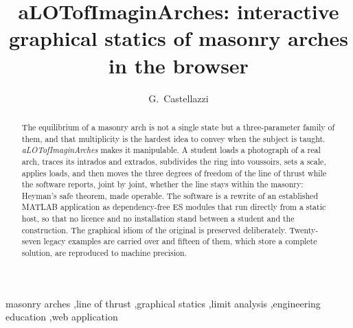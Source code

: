 \documentclass[final,3p,times,twocolumn]{elsarticle}
\begin{document}
\begin{frontmatter}

\title{aLOTofImaginArches: interactive graphical statics of masonry arches
       in the browser}

\author{G.~Castellazzi}
\address{Department of Civil, Chemical, Environmental and Materials
  Engineering (DICAM), University of Bologna, Viale Risorgimento 2,
  40136 Bologna, Italy \\
  \small{\tt giovanni.castellazzi@unibo.it}}

\begin{abstract}
The equilibrium of a masonry arch is not a single state but a
three-parameter family of them, and that multiplicity is the hardest idea to
convey when the subject is taught. \emph{aLOTofImaginArches} makes it
manipulable. A student loads a photograph of a real arch, traces its intrados
and extrados, subdivides the ring into voussoirs, sets a scale, applies loads,
and then moves the three degrees of freedom of the line of thrust while the
software reports, joint by joint, whether the line stays within the masonry:
Heyman's safe theorem, made operable. The software is a rewrite of an
established MATLAB application as dependency-free ES modules that run directly
from a static host, so that no licence and no installation stand between a
student and the construction. The graphical idiom of the original is preserved
deliberately. Twenty-seven legacy examples are carried over and fifteen of
them, which store a complete solution, are reproduced to machine precision.
\end{abstract}

\begin{keyword}
masonry arches \sep line of thrust \sep graphical statics \sep limit analysis
\sep engineering education \sep web application
\end{keyword}

\end{frontmatter}

\end{document}
